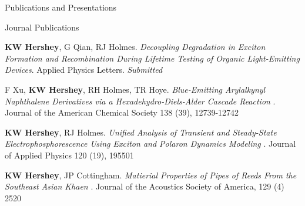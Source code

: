 \documentclass{resume} %
\begin{document}

\begin{rSection}{Publications and Presentations}
\begin{rSubsection}{Journal Publications}{}{}{}
\item  \textbf{KW Hershey}, G Qian, RJ Holmes. {\em Decoupling Degradation in Exciton Formation and Recombination During Lifetime Testing of Organic Light-Emitting Devices}. Applied Physics Letters. {\em Submitted}
\item F Xu, \textbf{KW Hershey}, RH Holmes, TR Hoye. {\em Blue-Emitting Arylalkynyl Naphthalene Derivatives via a Hexadehydro-Diels-Alder Cascade Reaction} . Journal of the American Chemical Society 138 (39), 12739-12742
\item \textbf{KW Hershey}, RJ Holmes. {\em Unified Analysis of Transient and Steady-State Electrophosphorescence Using Exciton and Polaron Dynamics Modeling} . Journal of Applied Physics 120 (19), 195501
\item \textbf{KW Hershey}, JP Cottingham. {\em Matierial Properties of Pipes of Reeds From the Southeast Asian Khaen} . Journal of the Acoustics Society of America, 129 (4) 2520

\end{rSubsection}



\end{rSection}
\end{document}
